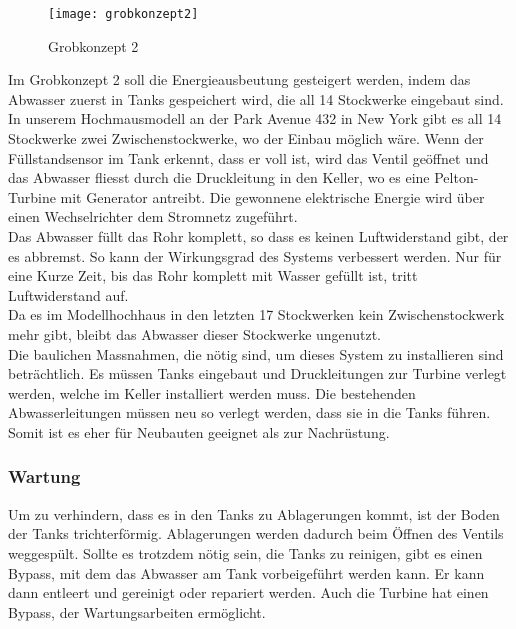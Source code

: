\newpage
\begin{wrapfigure}{r}{0.5\textwidth}
  \begin{center}
    \texttt{[image: grobkonzept2]}
  \end{center}
  \caption{Grobkonzept 2}
\end{wrapfigure}
Im Grobkonzept 2 soll die Energieausbeutung gesteigert werden, indem das Abwasser zuerst in Tanks gespeichert wird, die all 14 Stockwerke eingebaut sind. In unserem Hochmausmodell an der Park Avenue 432 in New York gibt es all 14 Stockwerke zwei Zwischenstockwerke, wo der Einbau möglich wäre. Wenn der Füllstandsensor im Tank erkennt, dass er voll ist, wird das Ventil geöffnet und das Abwasser fliesst durch die Druckleitung in den Keller, wo es eine Pelton-Turbine mit Generator antreibt. Die gewonnene elektrische Energie wird über einen Wechselrichter dem Stromnetz zugeführt. \\ 
Das Abwasser füllt das Rohr komplett, so dass es keinen Luftwiderstand gibt, der es abbremst. So kann der Wirkungsgrad des Systems verbessert werden. Nur für eine Kurze Zeit, bis das Rohr komplett mit Wasser gefüllt ist, tritt Luftwiderstand auf.\\
Da es im Modellhochhaus in den letzten 17 Stockwerken kein Zwischenstockwerk mehr gibt, bleibt das Abwasser dieser Stockwerke ungenutzt.\\
Die baulichen Massnahmen, die nötig sind, um dieses System zu installieren sind beträchtlich. Es müssen Tanks eingebaut und Druckleitungen zur Turbine verlegt werden, welche im Keller installiert werden muss. Die bestehenden Abwasserleitungen müssen neu so verlegt werden, dass sie in die Tanks führen. Somit ist es eher für Neubauten geeignet als zur Nachrüstung.\\

\subsubsection{Wartung}
Um zu verhindern, dass es in den Tanks zu Ablagerungen kommt, ist der Boden der Tanks trichterförmig. Ablagerungen werden dadurch beim Öffnen des Ventils weggespült. Sollte es trotzdem nötig sein, die Tanks zu reinigen, gibt es einen Bypass, mit dem das Abwasser am Tank vorbeigeführt werden kann.
Er kann dann entleert und gereinigt oder repariert werden. Auch die Turbine hat einen Bypass, der Wartungsarbeiten ermöglicht.\WFclear

